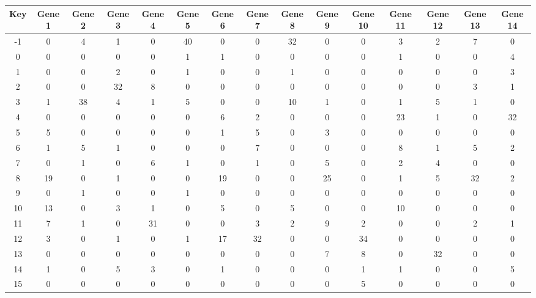 \begin{tabular}{|c|c|c|c|c|c|c|c|c|c|c|c|c|c|c|}
\hline
Key & Gene 1 & Gene 2 & Gene 3 & Gene 4 & Gene 5 & Gene 6 & Gene 7 & Gene 8 & Gene 9 & Gene 10 & Gene 11 & Gene 12 & Gene 13 & Gene 14 \\
\hline
-1 & 0 & 4 & 1 & 0 & 40 & 0 & 0 & 32 & 0 & 0 & 3 & 2 & 7 & 0 \\
0 & 0 & 0 & 0 & 0 & 1 & 1 & 0 & 0 & 0 & 0 & 1 & 0 & 0 & 4 \\
1 & 0 & 0 & 2 & 0 & 1 & 0 & 0 & 1 & 0 & 0 & 0 & 0 & 0 & 3 \\
2 & 0 & 0 & 32 & 8 & 0 & 0 & 0 & 0 & 0 & 0 & 0 & 0 & 3 & 1 \\
3 & 1 & 38 & 4 & 1 & 5 & 0 & 0 & 10 & 1 & 0 & 1 & 5 & 1 & 0 \\
4 & 0 & 0 & 0 & 0 & 0 & 6 & 2 & 0 & 0 & 0 & 23 & 1 & 0 & 32 \\
5 & 5 & 0 & 0 & 0 & 0 & 1 & 5 & 0 & 3 & 0 & 0 & 0 & 0 & 0 \\
6 & 1 & 5 & 1 & 0 & 0 & 0 & 7 & 0 & 0 & 0 & 8 & 1 & 5 & 2 \\
7 & 0 & 1 & 0 & 6 & 1 & 0 & 1 & 0 & 5 & 0 & 2 & 4 & 0 & 0 \\
8 & 19 & 0 & 1 & 0 & 0 & 19 & 0 & 0 & 25 & 0 & 1 & 5 & 32 & 2 \\
9 & 0 & 1 & 0 & 0 & 1 & 0 & 0 & 0 & 0 & 0 & 0 & 0 & 0 & 0 \\
10 & 13 & 0 & 3 & 1 & 0 & 5 & 0 & 5 & 0 & 0 & 10 & 0 & 0 & 0 \\
11 & 7 & 1 & 0 & 31 & 0 & 0 & 3 & 2 & 9 & 2 & 0 & 0 & 2 & 1 \\
12 & 3 & 0 & 1 & 0 & 1 & 17 & 32 & 0 & 0 & 34 & 0 & 0 & 0 & 0 \\
13 & 0 & 0 & 0 & 0 & 0 & 0 & 0 & 0 & 7 & 8 & 0 & 32 & 0 & 0 \\
14 & 1 & 0 & 5 & 3 & 0 & 1 & 0 & 0 & 0 & 1 & 1 & 0 & 0 & 5 \\
15 & 0 & 0 & 0 & 0 & 0 & 0 & 0 & 0 & 0 & 5 & 0 & 0 & 0 & 0 \\
\hline
\end{tabular}